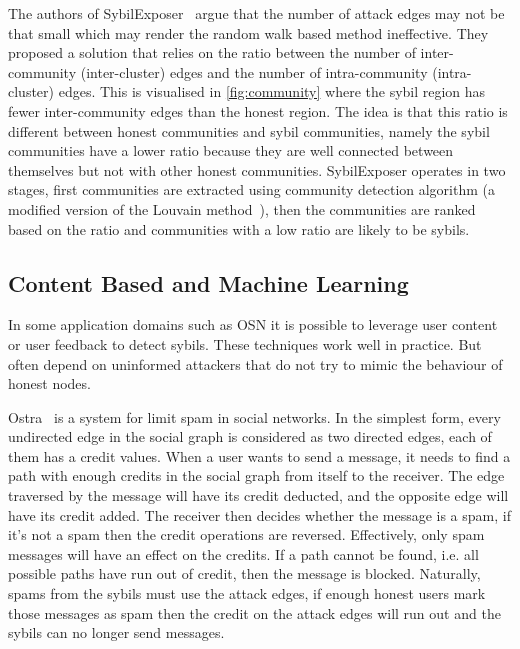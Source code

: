 The authors of SybilExposer~\cite{misra2016sybilexposer} argue that the number
of attack edges may not be that small which may render the random walk based
method ineffective. They proposed a solution that relies on the ratio between
the number of inter-community (inter-cluster) edges and the number of
intra-community (intra-cluster) edges. This is visualised in
\autoref{fig:community} where the sybil region has fewer
inter-community edges than the honest region. The idea is that this ratio is
different between honest communities and sybil communities, namely the sybil
communities have a lower ratio because they are well connected between
themselves but not with other honest communities. SybilExposer operates in two
stages, first communities are extracted using community detection algorithm (a
modified version of the Louvain method~\cite{blondel2008fast}), then the
communities are ranked based on the ratio and communities with a low ratio are
likely to be sybils.


\subsection{Content Based and Machine Learning}
\label{sec:content-based}
In some application domains such as OSN it is possible to leverage user content
or user feedback to detect sybils. These techniques work well in practice. But
often depend on uninformed attackers that do not try to mimic the behaviour of
honest nodes.

Ostra~\cite{mislove2008ostra} is a system for limit spam in social networks.
In the simplest form, every undirected edge in the social graph is considered as
two directed edges, each of them has a credit values. When a user wants to send
a message, it needs to find a path with enough credits in the social graph from
itself to the receiver. The edge traversed by the message will have its credit
deducted, and the opposite edge will have its credit added. The receiver then
decides whether the message is a spam, if it's not a spam then the credit
operations are reversed. Effectively, only spam messages will have an effect on
the credits. If a path cannot be found, i.e. all possible paths have run out of
credit, then the message is blocked. Naturally, spams from the sybils must use
the attack edges, if enough honest users mark those messages as spam then the
credit on the attack edges will run out and the sybils can no longer send
messages.

